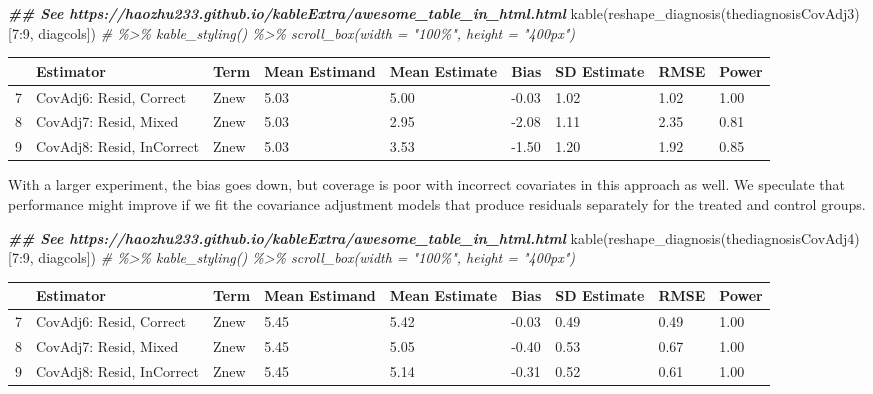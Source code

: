 \documentclass[
  12pt,
]{book}
\newenvironment{Shaded}{\begin{snugshade}}{\end{snugshade}}
\newcommand{\CommentTok}[1]{\textcolor[rgb]{0.56,0.35,0.01}{\textit{#1}}}
\newcommand{\DecValTok}[1]{\textcolor[rgb]{0.00,0.00,0.81}{#1}}
\newcommand{\DocumentationTok}[1]{\textcolor[rgb]{0.56,0.35,0.01}{\textbf{\textit{#1}}}}
\newcommand{\FunctionTok}[1]{\textcolor[rgb]{0.00,0.00,0.00}{#1}}
\newcommand{\NormalTok}[1]{#1}
\newcommand{\SpecialCharTok}[1]{\textcolor[rgb]{0.00,0.00,0.00}{#1}}
\theoremstyle{definition}
\theoremstyle{definition}
\theoremstyle{definition}
\theoremstyle{remark}
\begin{document}
\begin{Shaded}
\begin{Highlighting}[]
\DocumentationTok{\#\# See https://haozhu233.github.io/kableExtra/awesome\_table\_in\_html.html}
\FunctionTok{kable}\NormalTok{(}\FunctionTok{reshape\_diagnosis}\NormalTok{(thediagnosisCovAdj3)[}\DecValTok{7}\SpecialCharTok{:}\DecValTok{9}\NormalTok{, diagcols]) }\CommentTok{\# \%\textgreater{}\% kable\_styling() \%\textgreater{}\% scroll\_box(width = "100\%", height = "400px")}
\end{Highlighting}
\end{Shaded}

\begin{tabular}{l|l|l|l|l|l|l|l|l}
\hline
  & Estimator & Term & Mean Estimand & Mean Estimate & Bias & SD Estimate & RMSE & Power\\
\hline
7 & CovAdj6: Resid, Correct & Znew & 5.03 & 5.00 & -0.03 & 1.02 & 1.02 & 1.00\\
\hline
8 & CovAdj7: Resid, Mixed & Znew & 5.03 & 2.95 & -2.08 & 1.11 & 2.35 & 0.81\\
\hline
9 & CovAdj8: Resid, InCorrect & Znew & 5.03 & 3.53 & -1.50 & 1.20 & 1.92 & 0.85\\
\hline
\end{tabular}

With a larger experiment, the bias goes down, but coverage is poor with
incorrect covariates in this approach as well. We speculate that
performance might improve if we fit the covariance adjustment models
that produce residuals separately for the treated and control groups.

\begin{Shaded}
\begin{Highlighting}[]
\DocumentationTok{\#\# See https://haozhu233.github.io/kableExtra/awesome\_table\_in\_html.html}
\FunctionTok{kable}\NormalTok{(}\FunctionTok{reshape\_diagnosis}\NormalTok{(thediagnosisCovAdj4)[}\DecValTok{7}\SpecialCharTok{:}\DecValTok{9}\NormalTok{, diagcols]) }\CommentTok{\# \%\textgreater{}\% kable\_styling() \%\textgreater{}\% scroll\_box(width = "100\%", height = "400px")}
\end{Highlighting}
\end{Shaded}

\begin{tabular}{l|l|l|l|l|l|l|l|l}
\hline
  & Estimator & Term & Mean Estimand & Mean Estimate & Bias & SD Estimate & RMSE & Power\\
\hline
7 & CovAdj6: Resid, Correct & Znew & 5.45 & 5.42 & -0.03 & 0.49 & 0.49 & 1.00\\
\hline
8 & CovAdj7: Resid, Mixed & Znew & 5.45 & 5.05 & -0.40 & 0.53 & 0.67 & 1.00\\
\hline
9 & CovAdj8: Resid, InCorrect & Znew & 5.45 & 5.14 & -0.31 & 0.52 & 0.61 & 1.00\\
\hline
\end{tabular}
\end{document}

